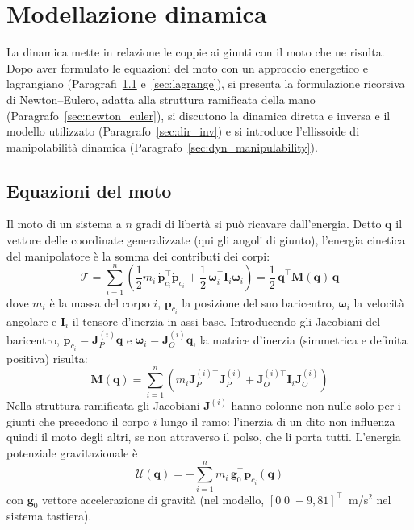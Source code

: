 \chapter{Modellazione dinamica}
\label{ch:dynamics}

La dinamica mette in relazione le coppie ai giunti con il moto che ne risulta. Dopo aver formulato le equazioni del moto con un approccio energetico e lagrangiano (Paragrafi~\ref{sec:eq_moto} e~\ref{sec:lagrange}), si presenta la formulazione ricorsiva di Newton--Eulero, adatta alla struttura ramificata della mano (Paragrafo~\ref{sec:newton_euler}), si discutono la dinamica diretta e inversa e il modello utilizzato (Paragrafo~\ref{sec:dir_inv}) e si introduce l'ellissoide di manipolabilità dinamica (Paragrafo~\ref{sec:dyn_manipulability}).

\section{Equazioni del moto}
\label{sec:eq_moto}

Il moto di un sistema a $n$ gradi di libertà si può ricavare dall'energia. 
Detto $\boldsymbol q$ il vettore delle coordinate generalizzate (qui gli angoli di giunto), l'energia cinetica del manipolatore è la somma dei contributi dei corpi:
\begin{equation}
    \mathcal{T}
    =\sum_{i=1}^{n}\left(\frac12 m_i\,\dot{\boldsymbol p}_{c_i}^\top\dot{\boldsymbol p}_{c_i}+\frac12\,\boldsymbol\omega_i^\top\boldsymbol I_i\boldsymbol\omega_i\right)
    =\frac12\,\dot{\boldsymbol q}^\top\boldsymbol M(\boldsymbol q)\,\dot{\boldsymbol q}
\end{equation}
dove $m_i$ è la massa del corpo $i$, $\boldsymbol p_{c_i}$ la posizione del suo baricentro, $\boldsymbol\omega_i$ la velocità angolare e $\boldsymbol I_i$ il tensore d'inerzia in assi base. 
Introducendo gli Jacobiani del baricentro, $\dot{\boldsymbol p}_{c_i}=\boldsymbol J_{P}^{(i)}\dot{\boldsymbol q}$ e $\boldsymbol\omega_i=\boldsymbol J_{O}^{(i)}\dot{\boldsymbol q}$, la matrice d'inerzia (simmetrica e definita positiva) risulta:
\begin{equation}
    \boldsymbol M(\boldsymbol q)=\sum_{i=1}^{n}\left(m_i\boldsymbol J_P^{(i)\top}\boldsymbol J_P^{(i)}+\boldsymbol J_O^{(i)\top}\boldsymbol I_i\boldsymbol J_O^{(i)}\right)
\end{equation}
Nella struttura ramificata gli Jacobiani $\boldsymbol J^{(i)}$ hanno colonne non nulle solo per i giunti che precedono il corpo $i$ lungo il ramo: l'inerzia di un dito non influenza quindi il moto degli altri, se non attraverso il polso, che li porta tutti. L'energia potenziale gravitazionale è
\begin{equation}
    \mathcal{U}(\boldsymbol q)=-\sum_{i=1}^{n}m_i\,\boldsymbol g_0^\top\boldsymbol p_{c_i}(\boldsymbol q)
\end{equation}
con $\boldsymbol g_0$ vettore accelerazione di gravità (nel modello, $[0\;0\;-9{,}81]^\top$~m/s$^2$ nel sistema tastiera).

